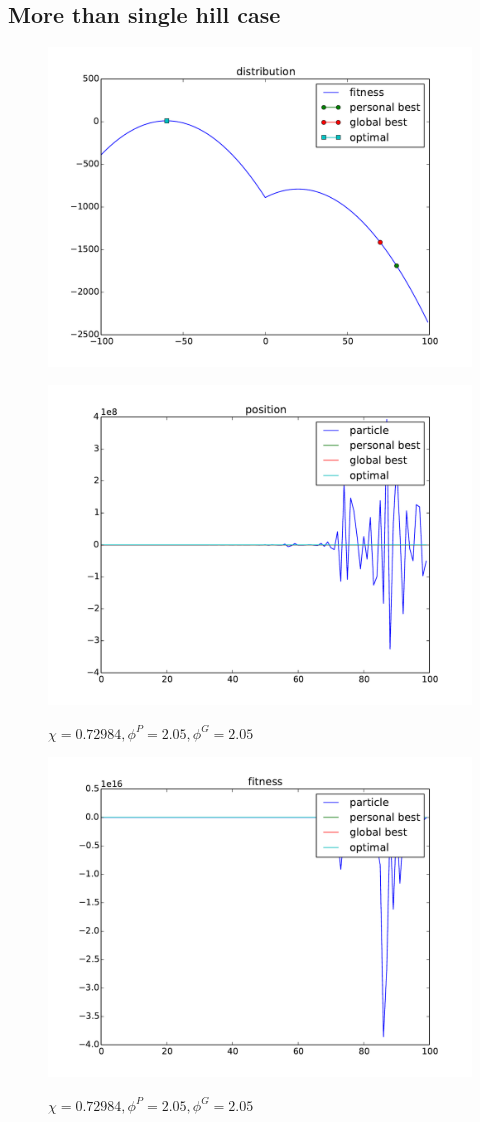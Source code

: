 \subsection{More than single hill case}


\begin{figure}[ht]
\centering
\includegraphics[width=.7\linewidth]{./simfig/case2/distribution2}
\label{fig:case2-1:distribution} 
\end{figure}

\begin{figure}[ht]
\centering
\includegraphics[width=.7\linewidth]{./simfig/case2/position2-1} 
\label{fig:case2-1:position}
\caption{$ \chi = 0.72984 , \phi^{P} = 2.05 , \phi^{G} = 2.05 $ }
\end{figure}

\begin{figure}[ht]
\centering
\includegraphics[width=.7\linewidth]{./simfig/case2/fitness2-1} 
\label{fig:case2-1:fitness}
\caption{$ \chi = 0.72984 , \phi^{P} = 2.05 , \phi^{G} = 2.05 $ }
\end{figure}


